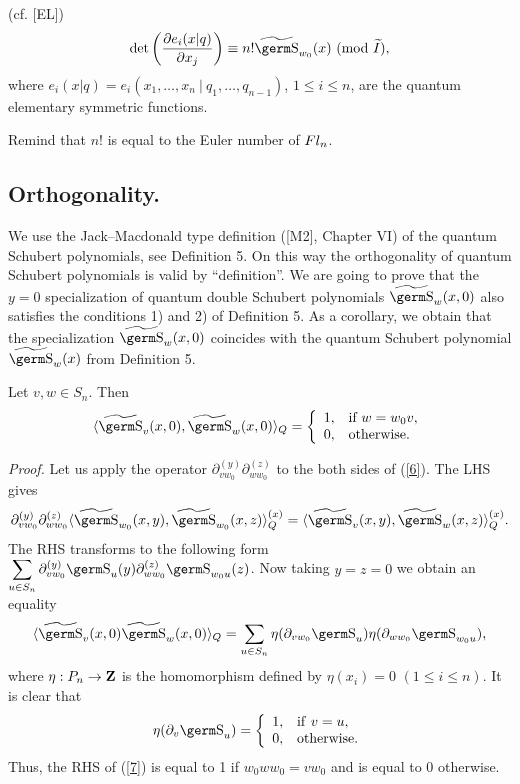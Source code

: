{{\begin{pr} (cf. [EL])\\
$$\det\left(\frac{\partial e_i(x|q)}{\partial x_j}\right)\equiv 
n!\wt{\s}_{w_0}(x)\ (\mod \wt I),
$$
where $e_i(x|q)=e_i(x_1,\ldots ,x_n~|~q_1,\ldots ,q_{n-1})$, $1\le i\le 
n$, are the quantum elementary symmetric functions.
\end{pr}

Remind that $n!$ is equal to the Euler number of $\hbox{$Fl_n$} $.

\subsection{Orthogonality.}

We use the Jack--Macdonald type definition ([M2], Chapter VI) of the
quantum Schubert polynomials, see Definition 5. On this way the 
orthogonality of quantum Schubert polynomials is valid by ``definition''.
We are going to prove that the $y=0$ specialization of quantum double
Schubert polynomials $\wt{\s}_w(x,0)$ also satisfies the conditions 1) and
2) of Definition 5. As a corollary, we obtain that the specialization 
$\wt{\s}_w(x,0)$ coincides with the quantum Schubert polynomial
$\wt{\s}_w(x)$ from Definition 5.
\begin{th}\label{101} Let $v,w\in S_n$. Then
$$\langle \wt{\s}_v(x,0),\wt{\s}_w(x,0)\rangle_Q=\left\{\begin{array}{ll}
1,& \mbox{{\rm if} $w=w_0v$},\\ 0,& \mbox{\rm otherwise}.\end{array}\right.
$$
\end{th}

{\it Proof.} Let us apply the operator 
$\partial_{vw_0}^{(y)}\partial_{ww_0}^{(z)}$ to the both sides of 
(\ref{6}). The LHS gives
$$\partial_{vw_0}^{(y)}\partial_{ww_0}^{(z)}\langle\wt{\s}_{w_0}(x,y),
\wt{\s}_{w_0}(x,z)\rangle_Q^{(x)}=\langle\wt{\s}_v(x,y),
\wt{\s}_w(x,z)\rangle_Q^{(x)}.
$$
The RHS transforms to the following form $\ds\sum_{u\in 
S_n}\partial_{vw_0}^{(y)}\s_u(y)\partial_{ww_0}^{(z)}\s_{w_0u}(z)$. Now 
taking $y=z=0$ we obtain an equality
\begin{equation} \langle\wt{\s}_v(x,0)\wt{\s}_w(x,0)\rangle_Q=\sum_{u\in 
S_n}\eta (\partial_{vw_0}\s_u)\eta (\partial_{ww_0}\s_{w_0u}),\label{7}
\end{equation}
where $\eta :P_n\to{\bf Z}$ is the homomorphism defined by $\eta 
(x_i)=0$ $(1\le i\le n)$. It is clear that
$$\eta (\partial_v\s_u)=\left\{\begin{array}{ll} 1, &{\rm if} \ v=u,\\
0, & {\rm otherwise}. \end{array}\right.
$$
Thus, the RHS of (\ref{7}) is equal to 1 if $w_0ww_0=vw_0$ and is equal 
to 0 otherwise.

}}

